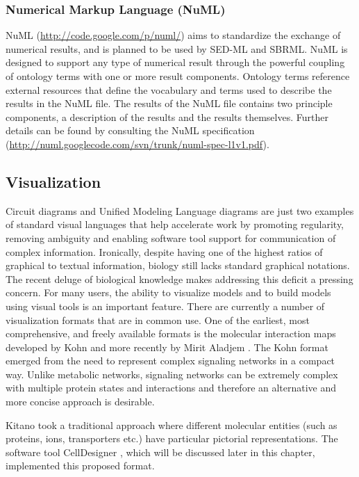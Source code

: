 \subsubsection{Numerical Markup Language (NuML)}

NuML (\url{http://code.google.com/p/numl/}) aims to standardize the
exchange of numerical results, and is planned to be used by SED-ML and
SBRML. NuML is designed to support any type of numerical result through
the powerful coupling of ontology terms with one or more result
components. Ontology terms reference external resources that define the
vocabulary and terms used to describe the results in the NuML file. The
results of the NuML file contains two principle components, a
description of the results and the results themselves. Further details
can be found by consulting the NuML specification
(\url{http://numl.googlecode.com/svn/trunk/numl-spec-l1v1.pdf}).

\subsection{Visualization}

Circuit diagrams and Unified Modeling Language diagrams are just two
examples of standard visual languages that help accelerate work by
promoting regularity, removing ambiguity and enabling software tool
support for communication of complex information. Ironically, despite
having one of the highest ratios of graphical to textual information,
biology still lacks standard graphical notations. The recent deluge of
biological knowledge makes addressing this deficit a pressing concern.
For many users, the ability to visualize models and to build models
using visual tools is an important feature. There are currently a number
of visualization formats that are in common use. One of the earliest,
most comprehensive, and freely available formats is the molecular
interaction maps developed by Kohn \autocite{Kohn1999} and more recently
by Mirit Aladjem \autocite{Kohn2004}. The Kohn format emerged from the
need to represent complex signaling networks in a compact way. Unlike
metabolic networks, signaling networks can be extremely complex with
multiple protein states and interactions and therefore an alternative
and more concise approach is desirable.

Kitano \autocite{Kitano2003} took a traditional approach where different
molecular entities (such as proteins, ions, transporters etc.) have
particular pictorial representations. The software tool CellDesigner
\autocite{CellDesigner2003}, which will be discussed later in this
chapter, implemented this proposed format.

